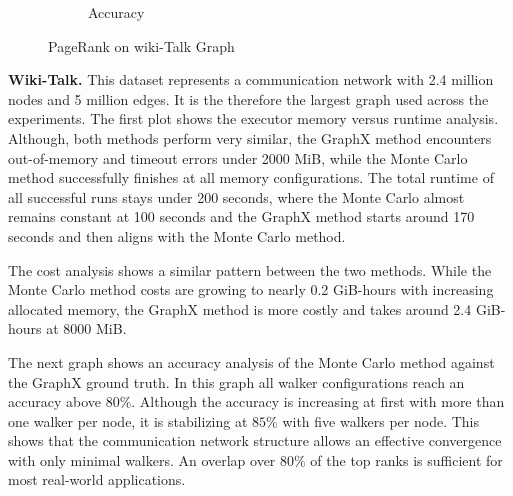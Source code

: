 \begin{figure}[H]
\begin{subfigure}[t]{0.5\linewidth}
        \caption{Accuracy}
        \label{fig:wikigibhrs}
    \end{subfigure}
    \caption{PageRank on wiki-Talk Graph}
    \label{fig:wiki-comparison}
\end{figure}

\textbf{Wiki-Talk.} This dataset represents a communication network with 2.4 million nodes and 5 million edges. It is the therefore the largest graph used across the experiments. The first plot shows the executor memory versus runtime analysis. Although, both methods perform very similar, the GraphX method encounters out-of-memory and timeout errors under 2000 MiB, while the Monte Carlo method successfully finishes at all memory configurations. The total runtime of all successful runs stays under 200 seconds, where the Monte Carlo almost remains constant at 100 seconds and the GraphX method starts around 170 seconds and then aligns with the Monte Carlo method.\par

The cost analysis shows a similar pattern between the two methods. While the Monte Carlo method costs are growing to nearly 0.2 GiB-hours with increasing allocated memory, the GraphX method is more costly and takes around 2.4 GiB-hours at 8000 MiB. \par
The next graph shows an accuracy analysis of the Monte Carlo method against the GraphX ground truth. In this graph all walker configurations reach an accuracy above $80\%$. Although the accuracy is increasing at first with more than one walker per node, it is stabilizing at $85\%$ with five walkers per node. This shows that the communication network structure allows an effective convergence with only minimal walkers. An overlap over $80\%$ of the top ranks is sufficient for most real-world applications. \par






